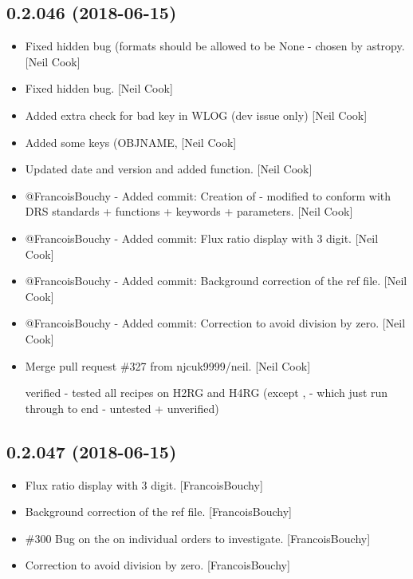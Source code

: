 \documentclass[a4paper,10pt,english]{report}
\begin{document}
\subsection{0.2.046 (2018-06-15)}
\label{\detokenize{misc/changelog:id418}}\begin{itemize}
\item {} 
Fixed hidden bug (formats should be allowed to be None - chosen by
astropy. {[}Neil Cook{]}

\item {} 
Fixed hidden bug. {[}Neil Cook{]}

\item {} 
Added extra check for bad key in WLOG (dev issue only) {[}Neil Cook{]}

\item {} 
Added some keys (OBJNAME,  {[}Neil Cook{]}

\item {} 
Updated date and version and added  function. {[}Neil
Cook{]}

\item {} 
@FrancoisBouchy - Added commit: Creation of  -
modified to conform with DRS standards + functions + keywords +
parameters. {[}Neil Cook{]}

\item {} 
@FrancoisBouchy - Added commit: Flux ratio display with 3 digit. {[}Neil
Cook{]}

\item {} 
@FrancoisBouchy - Added commit: Background correction of the ref file.
{[}Neil Cook{]}

\item {} 
@FrancoisBouchy - Added commit: Correction to avoid division by zero.
{[}Neil Cook{]}

\item {} 
Merge pull request \#327 from njcuk9999/neil. {[}Neil Cook{]}

verified - tested all recipes on H2RG and H4RG (except ,  - which just run through to end - untested + unverified)

\end{itemize}


\subsection{0.2.047 (2018-06-15)}
\label{\detokenize{misc/changelog:id419}}\begin{itemize}
\item {} 
Flux ratio display with 3 digit. {[}FrancoisBouchy{]}

\item {} 
Background correction of the ref file. {[}FrancoisBouchy{]}

\item {} 
\#300 Bug on the  on individual orders to investigate.
{[}FrancoisBouchy{]}

\item {} 
Correction to avoid division by zero. {[}FrancoisBouchy{]}

\end{itemize}
\end{document}
